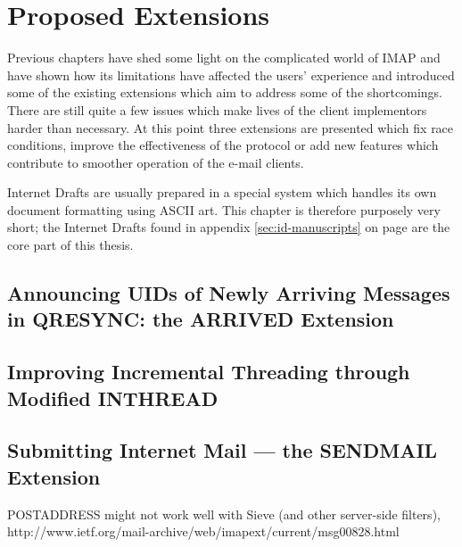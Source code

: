 \documentclass[trojita]{subfiles}
\begin{document}
\chapter{Proposed Extensions}

Previous chapters have shed some light on the complicated world of IMAP and have shown how its limitations have
affected the users' experience and introduced some of the existing extensions which aim to address some of the
shortcomings.  There are still quite a few issues which make lives of the client implementors harder than necessary.  At
this point three extensions are presented which fix race conditions, improve the effectiveness of the protocol or add new
features which contribute to smoother operation of the e-mail clients.

Internet Drafts are usually prepared in a special system which handles its own document formatting using ASCII art.
This chapter is therefore purposely very short; the Internet Drafts found in appendix \ref{sec:id-manuscripts} on page
\pageref{sec:id-manuscripts} are the core part of this thesis.

\section{Announcing UIDs of Newly Arriving Messages in QRESYNC: the ARRIVED Extension}
\label{sec:draft-arrived}

\section{Improving Incremental Threading through Modified INTHREAD}
\label{sec:draft-inthread-ext}

\section{Submitting Internet Mail --- the SENDMAIL Extension}
\label{sec:draft-sendmail}

POSTADDRESS might not work well with Sieve (and other server-side filters),
http://www.ietf.org/mail-archive/web/imapext/current/msg00828.html
\end{document}
